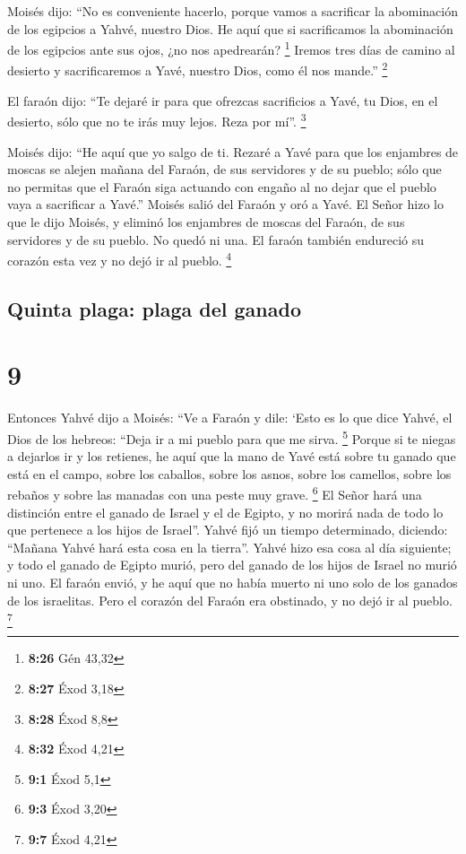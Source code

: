  Moisés dijo: ``No es conveniente hacerlo, porque vamos a
sacrificar la abominación de los egipcios a Yahvé, nuestro Dios. He aquí
que si sacrificamos la abominación de los egipcios ante sus ojos, ¿no
nos apedrearán? \footnote{\textbf{8:26} Gén 43,32} 
Iremos tres días de camino al desierto y sacrificaremos a Yavé, nuestro
Dios, como él nos mande.'' \footnote{\textbf{8:27} Éxod 3,18}

 El faraón dijo: ``Te dejaré ir para que ofrezcas
sacrificios a Yavé, tu Dios, en el desierto, sólo que no te irás muy
lejos. Reza por mí''. \footnote{\textbf{8:28} Éxod 8,8}

 Moisés dijo: ``He aquí que yo salgo de ti. Rezaré a Yavé
para que los enjambres de moscas se alejen mañana del Faraón, de sus
servidores y de su pueblo; sólo que no permitas que el Faraón siga
actuando con engaño al no dejar que el pueblo vaya a sacrificar a
Yavé.''  Moisés salió del Faraón y oró a Yavé.
 El Señor hizo lo que le dijo Moisés, y eliminó los
enjambres de moscas del Faraón, de sus servidores y de su pueblo. No
quedó ni una.  El faraón también endureció su corazón
esta vez y no dejó ir al pueblo. \footnote{\textbf{8:32} Éxod 4,21}

\hypertarget{quinta-plaga-plaga-del-ganado}{%
\subsection{Quinta plaga: plaga del
ganado}\label{quinta-plaga-plaga-del-ganado}}

\hypertarget{section-8}{%
\section{9}\label{section-8}}

 Entonces Yahvé dijo a Moisés: ``Ve a Faraón y dile: `Esto
es lo que dice Yahvé, el Dios de los hebreos: ``Deja ir a mi pueblo para
que me sirva. \footnote{\textbf{9:1} Éxod 5,1}  Porque si
te niegas a dejarlos ir y los retienes,  he aquí que la
mano de Yavé está sobre tu ganado que está en el campo, sobre los
caballos, sobre los asnos, sobre los camellos, sobre los rebaños y sobre
las manadas con una peste muy grave. \footnote{\textbf{9:3} Éxod 3,20}
 El Señor hará una distinción entre el ganado de Israel y
el de Egipto, y no morirá nada de todo lo que pertenece a los hijos de
Israel''.  Yahvé fijó un tiempo determinado, diciendo:
``Mañana Yahvé hará esta cosa en la tierra''.  Yahvé hizo
esa cosa al día siguiente; y todo el ganado de Egipto murió, pero del
ganado de los hijos de Israel no murió ni uno.  El faraón
envió, y he aquí que no había muerto ni uno solo de los ganados de los
israelitas. Pero el corazón del Faraón era obstinado, y no dejó ir al
pueblo. \footnote{\textbf{9:7} Éxod 4,21}

